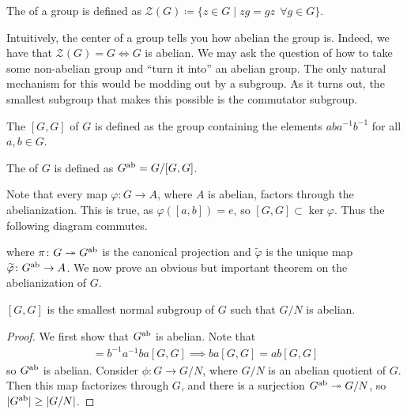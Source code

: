 \documentclass[11pt]{article}
\begin{document}
\begin{definition}
    The  of a group is defined as
    $\mathcal{Z}(G) \coloneqq \{ z \in G \mid zg = gz \: \: \forall g \in G \}$.
\end{definition}

Intuitively, the center of a group tells you how abelian the group is.
Indeed, we have that $\mathcal{Z}(G) = G \iff G$ is abelian.
We may ask the question of how to take some non-abelian group
and ``turn it into'' an abelian group. The only natural mechanism
for this would be modding out by a subgroup. As it turns out,
the smallest subgroup that makes this possible is the commutator
subgroup.

\begin{definition}
    The  $[G, G]$ of $G$ is
    defined as the group containing the elements $ab a^{-1} b^{-1}$
    for all $a, b \in G$.
\end{definition}

\begin{definition}
    The  of $G$ is defined as $G^{\rm ab} = G/[G, G]$.
\end{definition}

Note that every map $\varphi \colon G \to A$, where $A$ is abelian,
factors through the abelianization. This is true, as $\varphi([a, b]) = e$,
so $[G, G] \subset \ker{\varphi}$. Thus the following 
diagram commutes.


\begin{center}
\end{center}
\noin
where $\pi \colon G \twoheadrightarrow G^{\rm ab}$ is the canonical
projection and $\widetilde{\varphi}$ is the unique map $\widetilde{\varphi}
\colon G^{\rm ab} \to A$. We now prove an obvious but important theorem on the 
abelianization of $G$.

\begin{theorem}
    $[G, G]$ is the smallest normal subgroup of $G$ such that $G/N$ is abelian.
\end{theorem}

\begin{proof}
    We first show that $G^{\rm ab}$ is abelian. Note that
    \begin{align*}
        [G, G] = b^{-1} a^{-1} b a [G, G] \implies ba [G, G] = ab [G, G]
    \end{align*}
    so $G^{\rm ab}$ is abelian. Consider $\phi \colon G \to G/N$, where
    $G/N$ is an abelian quotient of $G$. Then this map factorizes through
    $G$, and there is a surjection $G^{\rm ab} \twoheadrightarrow G/N$, so 
    $|G^{\rm ab}| \geq |G/N|$. 
\end{proof}
\end{document}

